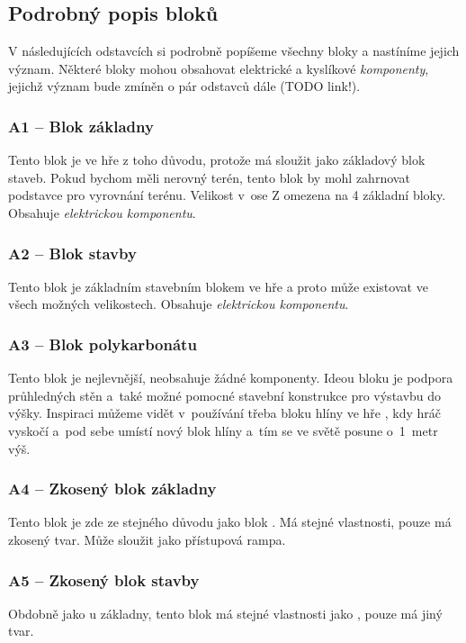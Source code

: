 \FloatBarrier


\subsection{Podrobný popis bloků}

V následujících odstavcích si podrobně popíšeme všechny bloky a nastíníme jejich význam. Některé bloky mohou obsahovat elektrické a kyslíkové \textit{komponenty}, jejichž význam bude zmíněn o pár odstavců dále (TODO link!).



\subsubsection{A1 -- Blok základny}
\label{blocks:A1}
Tento blok je ve hře z toho důvodu, protože má sloužit jako základový blok staveb. Pokud bychom měli nerovný terén, tento blok by mohl zahrnovat podstavce pro vyrovnání terénu. Velikost v~ose Z omezena na 4 základní bloky. Obsahuje \textit{elektrickou komponentu}.


\subsubsection{A2 -- Blok stavby}
\label{blocks:A2}
Tento blok je základním stavebním blokem ve hře a proto může existovat ve všech možných velikostech. Obsahuje \textit{elektrickou komponentu}.


\subsubsection{A3 -- Blok polykarbonátu}
\label{blocks:A3}
Tento blok je nejlevnější, neobsahuje žádné komponenty. Ideou bloku je podpora průhledných stěn a~také možné pomocné stavební konstrukce pro výstavbu do výšky. Inspiraci můžeme vidět v~používání třeba bloku hlíny ve hře \MC{}, kdy hráč vyskočí a~pod sebe umístí nový blok hlíny a~tím se ve světě posune o~1~metr výš.


\subsubsection{A4 -- Zkosený blok základny}
\label{blocks:A4}
Tento blok je zde ze stejného důvodu jako blok . Má stejné vlastnosti, pouze má zkosený tvar. Může sloužit jako přístupová rampa.


\subsubsection{A5 -- Zkosený blok stavby}
\label{blocks:A5}
Obdobně jako u základny, tento blok má stejné vlastnosti jako , pouze má jiný tvar.


